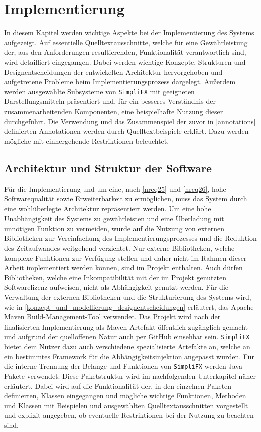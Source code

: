 \chapter{Implementierung}
\label{implementierung}
In diesem Kapitel werden wichtige Aspekte bei der Implementierung des Systems aufgezeigt. Auf essentielle Quelltextausschnitte, welche für eine Gewährleistung der, aus den Anforderungen resultierenden, Funktionalität verantwortlich sind, wird detailliert eingegangen. Dabei werden wichtige Konzepte, Strukturen und Designentscheidungen der entwickelten Architektur hervorgehoben und aufgetretene Probleme beim Implementierungsprozess dargelegt. Außerdem werden ausgewählte Subsysteme von \texttt{SimpliFX} mit geeigneten Darstellungsmitteln präsentiert und, für ein besseres Verständnis der zusammenarbeitenden Komponenten, eine beispielhafte Nutzung dieser durchgeführt. Die Verwendung und das Zusammenspiel der zuvor in \autoref{annotations} definierten Annotationen werden durch Quelltextbeispiele erklärt. Dazu werden mögliche mit einhergehende Restriktionen beleuchtet.
\section{Architektur und Struktur der Software}
\label{architektur}
Für die Implementierung und um eine, nach \autoref{nreq25} und \autoref{nreq26}, hohe Softwarequalität sowie Erweiterbarkeit zu ermöglichen, muss das System durch eine wohlüberlegte Architektur repräsentiert werden. Um eine hohe Unabhängigkeit des Systems zu gewährleisten und eine Überladung mit unnötigen Funktion zu vermeiden, wurde auf die Nutzung von externen Bibliotheken zur Vereinfachung des Implementierungsprozesses und die Reduktion des Zeitaufwandes weitgehend verzichtet. Nur externe Bibliotheken, welche komplexe Funktionen zur Verfügung stellen und daher nicht im Rahmen dieser Arbeit implementiert werden können, sind im Projekt enthalten. Auch dürfen Bibliotheken, welche eine Inkompatibilität mit der im Projekt genutzten Softwarelizenz aufweisen, nicht als Abhängigkeit genutzt werden. Für die Verwaltung der externen Bibliotheken und die Strukturierung des Systems wird, wie in \autoref{konzept_und_modellierung_designentscheidungen} erläutert, das Apache Maven Build-Management-Tool verwendet. Das Projekt wird nach der finalisierten Implementierung als Maven-Artefakt öffentlich zugänglich gemacht und aufgrund der quelloffenen Natur auch per GitHub einsehbar sein. \texttt{SimpliFX} bietet dem Nutzer dazu auch verschiedene spezialisierte Artefakte an, welche an ein bestimmtes Framework für die Abhängigkeitsinjektion angepasst wurden. Für die interne Trennung der Belange und Funktionen von \texttt{SimpliFX} werden Java Pakete verwendet. Diese Paketstruktur wird im nachfolgenden Unterkapitel näher erläutert. Dabei wird auf die Funktionalität der, in den einzelnen Paketen definierten, Klassen eingegangen und mögliche wichtige Funktionen, Methoden und Klassen mit Beispielen und ausgewählten Quelltextausschnitten vorgestellt und explizit angegeben, ob eventuelle Restriktionen bei der Nutzung zu beachten sind.
